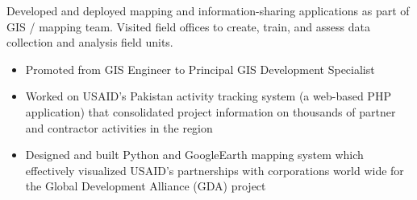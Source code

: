 \documentclass[letterpaper]{article}
\newif\ifDATACV
\newif\ifGISCV
\begin{document}
Developed and deployed mapping and information-sharing applications as part of
    \ifDATACV
        data team.  
    \else \ifGISCV
        GIS / mapping team.
    \fi \fi
Visited field offices to create, train, and assess data collection and analysis
field units.
    \ifGISCV
        Provided mapping and analysis services to staff and external partners.
        Collected, converted, and consolidated spatial data sets in a variety of
        formats into corporate spatial data warehouse. 
    \fi
\vspace{-1mm}
\begin{itemize} \itemsep 0pt
    \item Promoted from
        \ifDATACV
            Data Engineer to Principal Development Specialist
        \else \ifGISCV
            GIS Engineer to Principal GIS Development Specialist
        \fi \fi

    \item Worked on USAID's Pakistan activity tracking system (a
    web-based PHP application) that consolidated project information on
    thousands of partner and contractor activities in the region

    \item Designed and built Python and GoogleEarth mapping system which
    effectively visualized USAID's partnerships with corporations world wide for
    the Global Development Alliance (GDA) project


\end{itemize}
\vspace{1mm}
\end{document}
